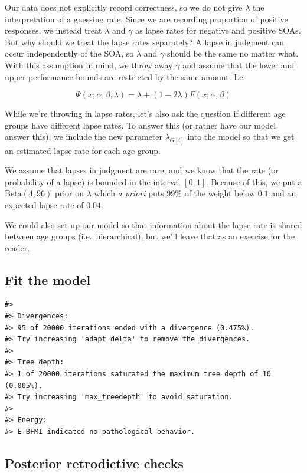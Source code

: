 \documentclass[11pt, oneside, openany]{scrbook}
\begin{document}
Our data does not explicitly record correctness, so we do not give \(\lambda\) the interpretation of a guessing rate. Since we are recording proportion of positive responses, we instead treat \(\lambda\) and \(\gamma\) as lapse rates for negative and positive SOAs. But why should we treat the lapse rates separately? A lapse in judgment can occur independently of the SOA, so \(\lambda\) and \(\gamma\) should be the same no matter what. With this assumption in mind, we throw away \(\gamma\) and assume that the lower and upper performance bounds are restricted by the same amount. I.e.

\[
\Psi(x; \alpha, \beta, \lambda) = \lambda + (1 - 2\lambda) F(x; \alpha, \beta)
\]

While we're throwing in lapse rates, let's also ask the question if different age groups have different lapse rates. To answer this (or rather have our model answer this), we include the new parameter \(\lambda_{G[i]}\) into the model so that we get an estimated lapse rate for each age group.

We assume that lapses in judgment are rare, and we know that the rate (or probability of a lapse) is bounded in the interval \([0, 1]\). Because of this, we put a \(\mathrm{Beta(4, 96)}\) prior on \(\lambda\) which \emph{a priori} puts 99\% of the weight below \(0.1\) and an expected lapse rate of \(0.04\).

We could also set up our model so that information about the lapse rate is shared between age groups (i.e.~hierarchical), but we'll leave that as an exercise for the reader.

\hypertarget{iter4-fit-obs}{%
\subsection{Fit the model}\label{iter4-fit-obs}}

\begin{verbatim}
#> 
#> Divergences:
#> 95 of 20000 iterations ended with a divergence (0.475%).
#> Try increasing 'adapt_delta' to remove the divergences.
#> 
#> Tree depth:
#> 1 of 20000 iterations saturated the maximum tree depth of 10 (0.005%).
#> Try increasing 'max_treedepth' to avoid saturation.
#> 
#> Energy:
#> E-BFMI indicated no pathological behavior.
\end{verbatim}

\hypertarget{iter4-post-retro}{%
\subsection{Posterior retrodictive checks}\label{iter4-post-retro}}
\end{document}
